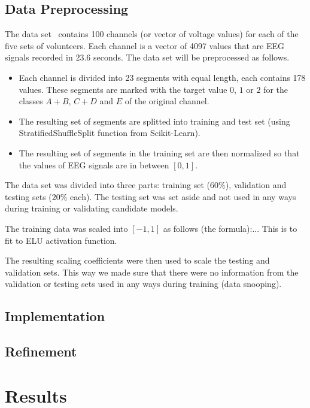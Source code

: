 \documentclass[12pt]{article}
\begin{document}
\subsection{Data Preprocessing}

The data set~\cite{andrzejak2001indications} contains 100 channels (or vector of voltage values) for each of the five sets of volunteers. Each channel is a vector of 4097 values that are EEG signals recorded in 23.6 seconds. The data set will be preprocessed as follows.
\begin{itemize}
\item Each channel is divided into 23 segments with equal length, each contains 178 values. These segments are marked with the target value $0$, $1$ or $2$ for the classes $A + B$, $C + D$ and $E$ of the original channel.
\item The resulting set of segments are splitted into training and test set (using StratifiedShuffleSplit function from Scikit-Learn).
\item The resulting set of segments in the training set are then normalized so that the values of EEG signals are in between $[0,1]$.
\end{itemize}

The data set was divided into three parts: training set ($60\%$), validation and testing sets ($20\%$ each). The testing set was set aside and not used in any ways during training or validating candidate models.

The training data was scaled into $[-1, 1]$ as follows (the formula):... This is to fit to ELU activation function.

The resulting scaling coefficients were then used to scale the testing and validation sets. This way we made sure that there were no information from the validation or testing sets used in any ways during training (data snooping).

\subsection{Implementation}

\subsection{Refinement}

\section{Results}
\end{document}
